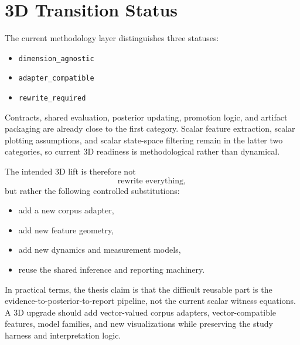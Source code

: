 \documentclass[11pt]{article}
\newcommand{\codepath}[1]{\nolinkurl{#1}}
\begin{document}
\section{3D Transition Status}
The current methodology layer distinguishes three statuses:
\begin{itemize}[leftmargin=1.5em]
  \item \codepath{dimension_agnostic}
  \item \codepath{adapter_compatible}
  \item \codepath{rewrite_required}
\end{itemize}
Contracts, shared evaluation, posterior updating, promotion logic, and
artifact packaging are already close to the first category. Scalar feature
extraction, scalar plotting assumptions, and scalar state-space filtering
remain in the latter two categories, so current 3D readiness is methodological
rather than dynamical.

The intended \(3\text{D}\) lift is therefore not
\begin{equation}
\text{rewrite everything},
\end{equation}
but rather the following controlled substitutions:
\begin{itemize}[leftmargin=1.5em]
  \item add a new corpus adapter,
  \item add new feature geometry,
  \item add new dynamics and measurement models,
  \item reuse the shared inference and reporting machinery.
\end{itemize}
In practical terms, the thesis claim is that the difficult reusable part is the
evidence-to-posterior-to-report pipeline, not the current scalar witness
equations. A \(3\text{D}\) upgrade should add vector-valued corpus adapters,
vector-compatible features, model families, and new visualizations while
preserving the study harness and interpretation logic.
\end{document}
